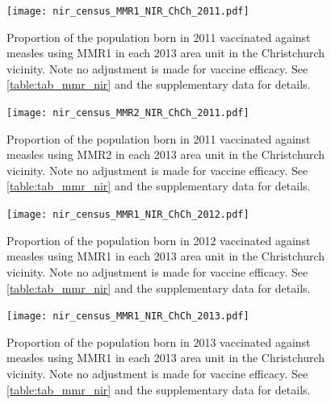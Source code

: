 \documentclass{article}
\begin{document}
\begin{figure}
\begin{center}
    \texttt{[image: nir\_census\_MMR1\_NIR\_ChCh\_2011.pdf]}
 \end{center}
    \caption{Proportion of the population born in 2011 vaccinated against measles using MMR1 in each 2013 area unit in the Christchurch vicinity. Note no adjustment is made for vaccine efficacy. See \autoref{table:tab_mmr_nir} and the supplementary data for details.}
\label{fig:fig12011_c}
\end{figure}


\begin{figure}
\begin{center}
    \texttt{[image: nir\_census\_MMR2\_NIR\_ChCh\_2011.pdf]}
 \end{center}
    \caption{Proportion of the population born in 2011 vaccinated against measles using MMR2 in each 2013 area unit in the Christchurch vicinity. Note no adjustment is made for vaccine efficacy. See \autoref{table:tab_mmr_nir} and the supplementary data for details.}
\label{fig:fig22011_c}
\end{figure}


\begin{figure}
\begin{center}
    \texttt{[image: nir\_census\_MMR1\_NIR\_ChCh\_2012.pdf]}
 \end{center}
    \caption{Proportion of the population born in 2012 vaccinated against measles using MMR1 in each 2013 area unit in the Christchurch vicinity. Note no adjustment is made for vaccine efficacy. See \autoref{table:tab_mmr_nir} and the supplementary data for details.}
\label{fig:fig12012_c}
\end{figure}

\begin{figure}
\begin{center}
    \texttt{[image: nir\_census\_MMR1\_NIR\_ChCh\_2013.pdf]}
 \end{center}
    \caption{Proportion of the population born in 2013 vaccinated against measles using MMR1 in each 2013 area unit in the Christchurch vicinity. Note no adjustment is made for vaccine efficacy. See \autoref{table:tab_mmr_nir} and the supplementary data for details.}
\label{fig:fig12013_c}
\end{figure}
\end{document}

